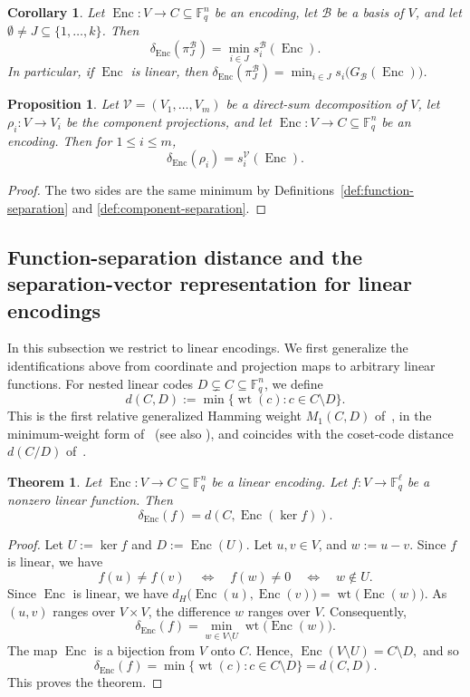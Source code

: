 \documentclass[a4paper,12pt]{article}
\theoremstyle{plain}
\newtheorem{theorem}[lemma]{Theorem}
\newtheorem{corollary}[lemma]{Corollary}
\newtheorem{proposition}[lemma]{Proposition}
\theoremstyle{definition}
\newcommand{\F}{\mathbb F}
\newcommand{\wt}{\operatorname{wt}}
\newcommand{\Enc}{\operatorname{Enc}}
\begin{document}
 
\begin{corollary}\label{cor:block-projection}
Let $\Enc\colon V\to C\subseteq\F_q^n$ be an encoding, let $\mathcal B$ be a
basis of $V$, and let $\emptyset\neq J\subseteq\{1,\dots,k\}$. Then
\[
\delta_{\Enc}(\pi_J^{\mathcal B})
=
\min_{i\in J}s_i^{\mathcal B}(\Enc).
\]
In particular, if $\Enc$ is linear, then
$\delta_{\Enc}(\pi_J^{\mathcal B})
=\min_{i\in J}s_i\bigl(G_{\mathcal B}(\Enc)\bigr)$.
\end{corollary}

\begin{proposition}\label{thm:component-uep}
Let $\mathcal V=(V_1,\dots,V_m)$ be a direct-sum decomposition of
$V$, let $\rho_i\colon V\to V_i$ be the component projections, and
let $\Enc\colon V\to C\subseteq\F_q^n$ be an encoding. Then
for $1\leq i\leq m$,
\[
\delta_{\Enc}(\rho_i)=s_i^{\mathcal V}(\Enc).
\]
\end{proposition}

\begin{proof}
The two sides are the same minimum by
Definitions~\ref{def:function-separation} and
\ref{def:component-separation}.
\end{proof}

\subsection{Function-separation distance and the separation-vector representation for linear encodings}
\label{sec:subspace}
In this subsection we restrict to linear encodings. We first generalize the identifications above from coordinate
and projection maps to arbitrary linear functions.
For nested linear codes $D\subsetneq C\subseteq\F_q^n$, we define
\[
d(C,D):=\min\{\wt(c):c\in C\setminus D\}.
\]
This is the first relative generalized Hamming weight $M_1(C,D)$ of~\cite{luo2005}, in the minimum-weight form
of~\cite[Lemma~1]{liu2008} (see also \cite{geil2014,zhuang2013}), and coincides with the coset-code distance $d(C/D)$ of~\cite[Definition~17]{rajput2026}.


\begin{theorem}
\label{thm:kernel-formula}
Let $\Enc\colon V\to C \subseteq \F_q^n$ be a linear encoding. 
Let $f\colon V\to\F_q^\ell$ be a nonzero linear function.
Then
\[
\delta_{\Enc}(f) = d(C,\Enc(\ker f)).
\]
\end{theorem}

\begin{proof} Let $U:=\ker f$ and $D:=\Enc(U)$.  
Let $u,v\in V$, and  $w:=u-v$. Since $f$ is linear, we have
\[
f(u)\neq f(v)
\quad\Longleftrightarrow\quad
f(w)\neq0
\quad\Longleftrightarrow\quad
w\notin U.
\]
Since $\Enc$ is linear, we have
$
d_H\bigl(\Enc(u),\Enc(v)\bigr)
=
\wt\bigl(\Enc(w)\bigr).
$
As $(u,v)$ ranges over $V \times V$, the difference $w$ ranges over $V$.
Consequently,
\[
\delta_{\Enc}(f)
=
\min_{w\in V\setminus U}\wt\bigl(\Enc(w)\bigr).
\]
The map $\Enc$ is a bijection from $V$ onto $C$. Hence,
$
\Enc(V\setminus U)=C\setminus D,
$
and so 
\[
\delta_{\Enc}(f)
=
\min\{\wt(c):c\in C\setminus D\}
=
d(C,D).
\]
This proves the theorem.
\end{proof}
\end{document}

